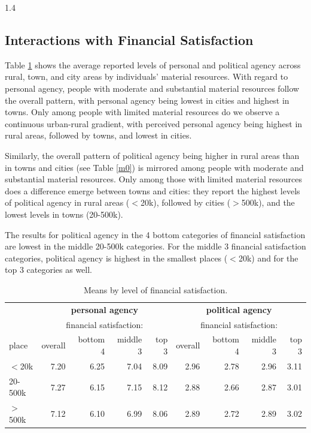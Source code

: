 \documentclass[10pt, letterpaper]{article}
\begin{document}
\begin{spacing}{1.4}
  
\subsection{Interactions with Financial Satisfaction}

Table \ref{m1} shows the average reported levels of personal and political agency across rural, town, and city areas by individuals' material resources.
With regard to personal agency, people with moderate and substantial material
resources follow the overall pattern, with personal agency being lowest in
cities and highest in towns. Only among people with limited material resources
do we observe a continuous urban-rural gradient, with perceived personal agency
being highest in rural areas, followed by towns, and lowest in cities.

Similarly, the overall pattern of political agency being higher in rural areas
than in towns and cities (see Table \ref{m0}) is mirrored among people with moderate
and substantial material resources. Only among those with limited material
resources does a difference emerge between towns and cities: they report the
highest levels of political agency in rural areas ($<$20k), followed by cities ($>$500k), and the
lowest levels in towns (20-500k).

The results for political agency in the 4 bottom categories of financial
satisfaction are lowest in the middle 20-500k categories. For the middle 3
financial satisfaction categories, political agency is highest in the smallest
places ($<$20k) and for the top 3 categories as well.

\begin{table}[H]\centering\footnotesize
\caption{\label{m1} Means by level of financial satisfaction.}
\begin{tabular} {lrrrr|rrrr}   \hline 
       & \multicolumn{4}{c|}{\bf personal agency}          &\multicolumn{4}{c}{\bf political agency}\\
       & \multicolumn{4}{c}{financial satisfaction:}          &\multicolumn{4}{c}{financial satisfaction:}\\ 
place  &overall&bottom 4    &middle 3   &top 3&overall&bottom 4        &middle 3 &top 3\\ \hline
$<$20k &7.20   & 6.25       &7.04        &8.09&2.96   & 2.78           & 2.96        &3.11\\
20-500k&7.27   & 6.15       &7.15        &8.12&2.88   & 2.66           & 2.87        &3.01\\
$>$500k&7.12   & 6.10       &6.99        &8.06&2.89   & 2.72           & 2.89        &3.02\\ \hline
\end{tabular}\end{table}


\end{spacing}
\end{document}
